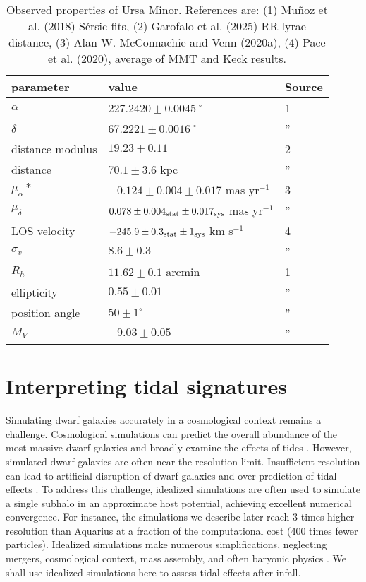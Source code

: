 \begin{table*}[t]
\centering
\caption[Observed Properties of Ursa Minor]{Observed properties of Ursa Minor. References are: (1) Muñoz et al. (2018) Sérsic fits, (2) Garofalo et al. (2025) RR lyrae distance, (3) Alan W. McConnachie and Venn (2020a), (4) Pace et al. (2020), average of MMT and Keck results. }
\label{tbl:umi_obs_props}
\begin{tabular}{lll}
\toprule
parameter & value & Source\\
\midrule
$\alpha$ & $ 227.2420 \pm 0.0045$˚ & 1\\
$\delta$ & $67.2221 \pm 0.0016$˚ & ”\\
distance modulus & $19.23 \pm 0.11$ & 2\\
distance & $70.1 \pm 3.6$ kpc & ”\\
$\mu_\alpha*$ & $-0.124 \pm 0.004 \pm 0.017$ mas yr$^{-1}$ & 3\\
$\mu_\delta$ & $0.078 \pm 0.004_{\rm stat} \pm 0.017_{\rm sys}$ mas yr$^{-1}$ & ”\\
LOS velocity & $-245.9 \pm 0.3_{\rm stat} \pm 1_{\rm sys}$ km s$^{-1}$ & 4\\
$\sigma_v$ & $8.6 \pm 0.3$ & ”\\
$R_h$ & $11.62 \pm 0.1$ arcmin & 1\\
ellipticity & $0.55 \pm 0.01$ & ”\\
position angle & $50 \pm 1^\circ$ & ”\\
$M_V$ & $-9.03 \pm 0.05$ & ”\\
\bottomrule
\end{tabular}
\end{table*}

\section{Interpreting tidal signatures}\label{sec:tidal_theory}

Simulating dwarf galaxies accurately in a cosmological context remains a
challenge. Cosmological simulations can predict the overall abundance of
the most massive dwarf galaxies \citep[e.g.,][]{sawala+2016} and broadly
examine the effects of tides \citep[e.g.,][]{riley+2024}. However,
simulated dwarf galaxies are often near the resolution limit.
Insufficient resolution can lead to artificial disruption of dwarf
galaxies and over-prediction of tidal effects
\citep[e.g.,][]{vandenbosch+2018, santos-santos+2025}. To address this
challenge, idealized simulations are often used to simulate a single
subhalo in an approximate host potential, achieving excellent numerical
convergence. For instance, the simulations we describe later reach 3
times higher resolution than Aquarius \citep{springel+2008} at a
fraction of the computational cost (400 times fewer particles).
Idealized simulations make numerous simplifications, neglecting mergers,
cosmological context, mass assembly, and often baryonic physics
\citep[e.g.,][]{hayashi+2003, bullock+johnston2005, klimentowski+2009, ogiya+2019}.
We shall use idealized simulations here to assess tidal effects after
infall.

